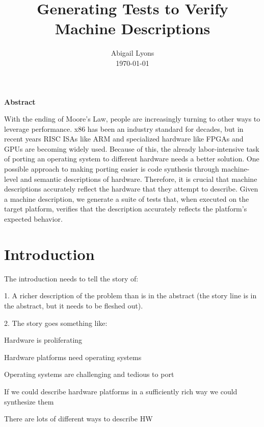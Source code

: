 \documentclass[letterpaper,12pt]{article}
\begin{document}
\title{\bf \LARGE Generating Tests to Verify Machine Descriptions}

\author{
{\rm Abigail Lyons}\\
{\rm \today}
}
\maketitle
\thispagestyle{empty}

\vspace*{2\baselineskip}
{\centering
  \bf{Abstract}\par
}
With the ending of Moore's Law, people are increasingly turning to other ways to leverage performance. x86 has been an industry standard for decades, but in recent years RISC ISAs like ARM and specialized hardware like FPGAs and GPUs are becoming widely used. Because of this, the already labor-intensive task of porting an operating system to different hardware needs a better solution. One possible approach to making porting easier is code synthesis through machine-level and semantic descriptions of hardware. Therefore, it is crucial that machine descriptions accurately reflect the hardware that they attempt to describe. Given a machine description, we generate a suite of tests that, when executed on the target platform, verifies that the description accurately reflects the platform's expected behavior.

\pagebreak

\tableofcontents

\pagebreak

\section{Introduction}

The introduction needs to tell the story of:

1. A richer description of the problem than is in the abstract (the story line is in the abstract, but it needs to be fleshed out).

2. The story goes something like:

Hardware is proliferating

Hardware platforms need operating systems

Operating systems are challenging and tedious to port

If we could describe hardware platforms in a sufficiently rich way we could synthesize them

There are lots of different ways to describe HW
\end{document}
